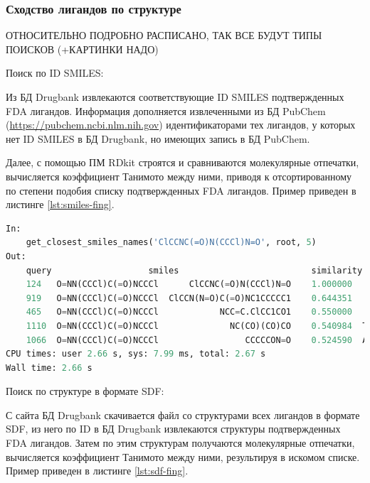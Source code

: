 \documentclass[a4paper,14pt]{article}         %
\begin{document}
\subsubsection{Сходство лигандов по структуре}
\color{orange} ОТНОСИТЕЛЬНО ПОДРОБНО РАСПИСАНО, ТАК ВСЕ БУДУТ ТИПЫ ПОИСКОВ (+КАРТИНКИ НАДО)
\color{black}

Поиск по ID SMILES:

Из БД Drugbank извлекаются соответствующие ID SMILES подтвержденных FDA лигандов. Информация дополняется извлеченными из БД PubChem (\href{https://pubchem.ncbi.nlm.nih.gov}{https://pubchem.ncbi.nlm.nih.gov}) идентификаторами тех лигандов, у которых нет ID SMILES в БД Drugbank, но имеющих запись в БД PubChem.

Далее, с помощью ПМ RDkit строятся и сравниваются молекулярные отпечатки, вычисляется коэффициент Танимото между ними, приводя к отсортированному по степени подобия списку подтвержденных FDA лигандов. Пример приведен в листинге \ref{lst:smiles-fing}.

\begin{lstlisting}[language=Python, label={lst:smiles-fing}, caption={Сходство лигандов по текстовым молекулярным отпечаткам с помощью ПМ RDkit для входных данных~--- SMILES структуры молекулы.}]
In:
	get_closest_smiles_names('ClCCNC(=O)N(CCCl)N=O', root, 5)
Out:
	query       			smiles  						similarity         			 name
	124   O=NN(CCCl)C(=O)NCCCl      ClCCNC(=O)N(CCCl)N=O    1.000000    Carmustine
	919   O=NN(CCCl)C(=O)NCCCl  ClCCN(N=O)C(=O)NC1CCCCC1    0.644351     Lomustine
	465   O=NN(CCCl)C(=O)NCCCl            NCC=C.ClCC1CO1    0.550000     Sevelamer
	1110  O=NN(CCCl)C(=O)NCCCl              NC(CO)(CO)CO    0.540984  Tromethamine
	1066  O=NN(CCCl)C(=O)NCCCl                 CCCCCON=O    0.524590  Amyl Nitrite
CPU times: user 2.66 s, sys: 7.99 ms, total: 2.67 s
Wall time: 2.66 s
\end{lstlisting}

Поиск по структуре в формате SDF:

С сайта БД Drugbank скачивается файл со структурами всех лигандов в формате SDF, из него по ID в БД Drugbank извлекаются структуры подтвержденных FDA лигандов. Затем по этим структурам получаются молекулярные отпечатки, вычисляется коэффициент Танимото между ними, результируя в искомом списке. Пример приведен в листинге \ref{lst:sdf-fing}.
\end{document}
